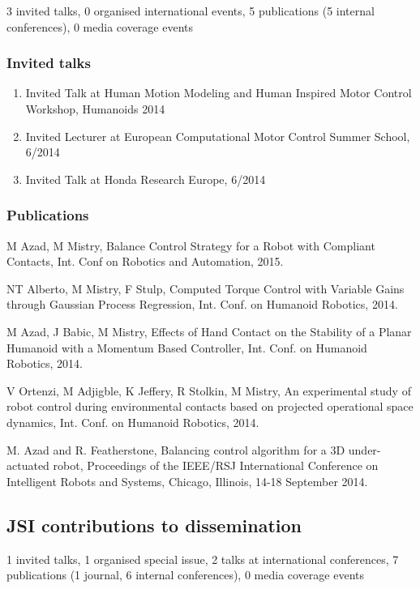 3 invited talks, 0 organised international events, 5 publications (5 internal conferences), 0 media coverage events

\subsubsection{Invited talks}

\begin{enumerate}
\item Invited Talk at Human Motion Modeling and Human Inspired Motor Control Workshop, Humanoids 2014
\item Invited Lecturer at European Computational Motor Control Summer School, 6/2014
\item Invited Talk at Honda Research Europe, 6/2014
\end{enumerate}

\subsubsection{Publications}

M Azad, M Mistry, Balance Control Strategy for a Robot with Compliant Contacts, Int. Conf on Robotics and Automation, 2015.

NT Alberto, M Mistry, F Stulp, Computed Torque Control with Variable Gains through Gaussian Process Regression, Int. Conf. on Humanoid Robotics, 2014.

M Azad, J Babic, M Mistry, Effects of Hand Contact on the Stability of a Planar Humanoid with a Momentum Based Controller, Int. Conf. on Humanoid Robotics, 2014.

V Ortenzi, M Adjigble, K Jeffery, R Stolkin, M Mistry, An experimental study of robot control during environmental contacts based on projected operational space dynamics, Int. Conf. on Humanoid Robotics, 2014.

M. Azad and R. Featherstone, Balancing control algorithm for a 3D under-actuated robot, Proceedings of the IEEE/RSJ International Conference on Intelligent Robots and Systems, Chicago, Illinois, 14-18 September 2014.

\subsection{JSI contributions to dissemination}

1 invited talks, 1 organised special issue, 2 talks at international conferences, 7 publications (1 journal, 6 internal conferences), 0 media coverage events

